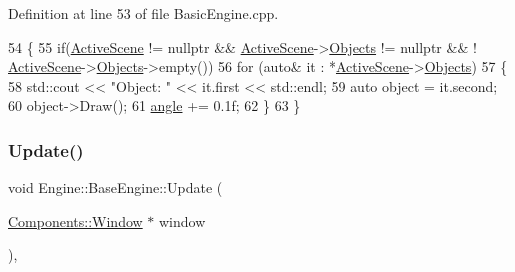 Definition at line 53 of file Basic\+Engine.\+cpp.


\begin{DoxyCode}
54 \{
55     \textcolor{keywordflow}{if}(\mbox{\hyperlink{classEngine_1_1BaseEngine_adb3dbc839da9d821e08b18d8a221698d}{ActiveScene}} != \textcolor{keyword}{nullptr} && \mbox{\hyperlink{classEngine_1_1BaseEngine_adb3dbc839da9d821e08b18d8a221698d}{ActiveScene}}->\mbox{\hyperlink{classEngine_1_1Components_1_1Scene_a23481feabaaa56bf5613765db03af4da}{Objects}} != \textcolor{keyword}{nullptr} && !
      \mbox{\hyperlink{classEngine_1_1BaseEngine_adb3dbc839da9d821e08b18d8a221698d}{ActiveScene}}->\mbox{\hyperlink{classEngine_1_1Components_1_1Scene_a23481feabaaa56bf5613765db03af4da}{Objects}}->empty())
56     \textcolor{keywordflow}{for} (\textcolor{keyword}{auto}& it : *\mbox{\hyperlink{classEngine_1_1BaseEngine_adb3dbc839da9d821e08b18d8a221698d}{ActiveScene}}->\mbox{\hyperlink{classEngine_1_1Components_1_1Scene_a23481feabaaa56bf5613765db03af4da}{Objects}})
57     \{
58         std::cout << \textcolor{stringliteral}{"Object: "} << it.first << std::endl;
59         \textcolor{keyword}{auto} \textcolor{keywordtype}{object} = it.second;
60         \textcolor{keywordtype}{object}->Draw();
61         \mbox{\hyperlink{classApplication_1_1Engines_1_1BasicEngine_aad99e45bc67ec33b4fc26b38b9c8a31e}{angle}} += 0.1f;
62     \}
63 \}
\end{DoxyCode}
\mbox{\label{classEngine_1_1BaseEngine_a01c23c2073f08939a660f3b7a866852c}} 
\subsubsection{\texorpdfstring{Update()}{Update()}\hspace{0.1cm}{\footnotesize\ttfamily [2/2]}}
{\footnotesize\ttfamily void Engine\+::\+Base\+Engine\+::\+Update (\begin{DoxyParamCaption}\item[{\mbox{\hyperlink{classEngine_1_1Components_1_1Window}{Components\+::\+Window}} $\ast$}]{window }\end{DoxyParamCaption})\hspace{0.3cm}{\ttfamily [virtual]}, {\ttfamily [inherited]}}



